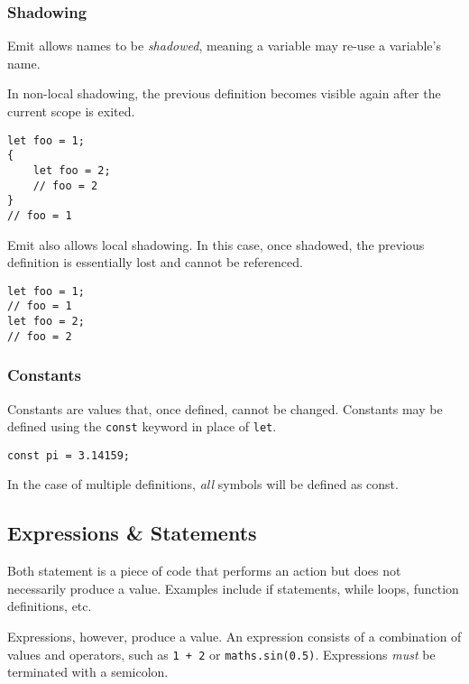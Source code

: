 \documentclass{article}
\begin{document}
    \subsubsection{Shadowing}

    Emit allows names to be \textit{shadowed}, meaning a variable may re-use a variable's name.

    In non-local shadowing, the previous definition becomes visible again after the current scope is exited.
    \begin{lstlisting}[language=CustomLang]
let foo = 1;
{
    let foo = 2;
    // foo = 2
}
// foo = 1
    \end{lstlisting}

    Emit also allows local shadowing.
    In this case, once shadowed, the previous definition is essentially lost and cannot be referenced.
    \begin{lstlisting}[language=CustomLang]
let foo = 1;
// foo = 1
let foo = 2;
// foo = 2
    \end{lstlisting}

    \subsubsection{Constants}

    Constants are values that, once defined, cannot be changed.
    Constants may be defined using the \texttt{const} keyword in place of \texttt{let}.

    \begin{lstlisting}[language=CustomLang]
const pi = 3.14159;
    \end{lstlisting}

    In the case of multiple definitions, \textit{all} symbols will be defined as const.

    \subsection{Expressions \& Statements}\label{subsec:expressions-&-statements}

    Both statement is a piece of code that performs an action but does not necessarily produce a value.
    Examples include if statements, while loops, function definitions, etc.

    Expressions, however, produce a value.
    An expression consists of a combination of values and operators, such as \texttt{1 + 2} or \texttt{maths.sin(0.5)}.
    Expressions \textit{must} be terminated with a semicolon.
\end{document}
